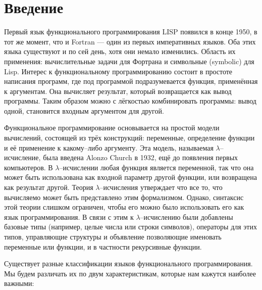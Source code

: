 \section{Введение}

Первый язык функционального программирования LISP появился в конце 1950, в тот
же момент, что и Fortran --- один из первых императивных языков. Оба этих языка
существуют и по сей день, хотя они немало изменились. Область их применения:
вычислительные задачи для Фортрана и символьные (symbolic) для Lisp. Интерес к
функциональному программированию состоит в простоте написания программ, где под
программой подразумевается функция, применённая к аргументам. Она вычисляет
результат, который возвращается как вывод программы. Таким образом можно с
лёгкостью комбинировать программы: вывод одной, становится входным аргументом
для другой.

Функциональное программирование основывается на простой модели вычислений,
состоящей из трёх конструкций: переменные, определение функции и её применение к
какому--либо аргументу. Эта модель, называемая $\lambda$--исчисление, была
введена Alonzo Church в 1932, ещё до появления первых компьютеров. В
$\lambda$--исчислении любая функция является переменной, так что она может быть
использована как входной параметр другой функции, или возвращена как результат
другой. Теория $\lambda$--исчисления утверждает что все то, что вычисляемо может
быть представлено этим формализмом. Однако, синтаксис этой теории слишком
ограничен, чтобы его можно было использовать его как язык программирования. В
связи с этим к $\lambda$--исчислению были добавлены базовые типы (например,
целые числа или строки символов), операторы для этих типов, управляющие
структуры и объявление позволяющие именовать переменные или функции, и в
частности рекурсивные функции.

Существует разные классификации языков функционального программирования. Мы
будем различать их по двум характеристикам, которые нам кажутся наиболее
важными:

